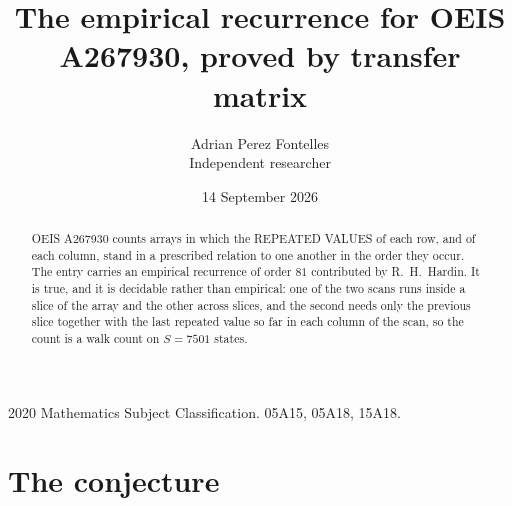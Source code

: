 \documentclass[11pt,a4paper]{article}
\title{The empirical recurrence for OEIS A267930, proved by transfer matrix}
\author{Adrian Perez Fontelles\\ \small Independent researcher}
\date{14 September 2026}
\theoremstyle{plain}
\theoremstyle{definition}
\begin{document}
\maketitle

\begin{abstract}
OEIS A267930 counts arrays in which the REPEATED VALUES of each row, and of each column, stand in a
prescribed relation to one another in the order they occur. The entry carries an empirical
recurrence of order $81$ contributed by R.~H.~Hardin. It is true, and it is decidable
rather than empirical: one of the two scans runs inside a slice of the array and the other
across slices, and the second needs only the previous slice together with the last repeated
value so far in each column of the scan, so the count is a walk count on $S=7501$ states.
\end{abstract}

\noindent\small 2020 Mathematics Subject Classification. 05A15, 05A18, 15A18.\normalsize

\section{The conjecture}
\end{document}
